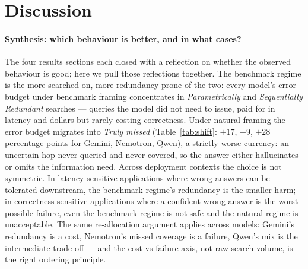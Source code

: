 \documentclass[10pt,letterpaper]{article}
\begin{document}
\section{Discussion}\label{sec:discussion}

\paragraph{Synthesis: which behaviour is better, and in what cases?}
The four results sections each closed with a reflection on whether the observed
behaviour is good; here we pull those reflections together. The benchmark regime is
the more searched-on, more redundancy-prone of the two: every model's error budget
under benchmark framing concentrates in \emph{Parametrically} and \emph{Sequentially
Redundant} searches --- queries the model did not need to issue, paid for in latency
and dollars but rarely costing correctness. Under natural framing the error budget
migrates into \emph{Truly missed} (Table~\ref{tab:shift}: $+17$, $+9$, $+28$
percentage points for Gemini, Nemotron, Qwen), a strictly worse currency: an uncertain
hop never queried and never covered, so the answer either hallucinates or omits the
information need. Across deployment contexts the choice is not symmetric. In
latency-sensitive applications where wrong answers can be tolerated downstream,
the benchmark regime's redundancy is the smaller harm; in correctness-sensitive
applications where a confident wrong answer is the worst possible failure, even the
benchmark regime is not safe and the natural regime is unacceptable. The same
re-allocation argument applies across models: Gemini's redundancy is a cost,
Nemotron's missed coverage is a failure, Qwen's mix is the intermediate trade-off ---
and the cost-vs-failure axis, not raw search volume, is the right ordering principle.
\end{document}
